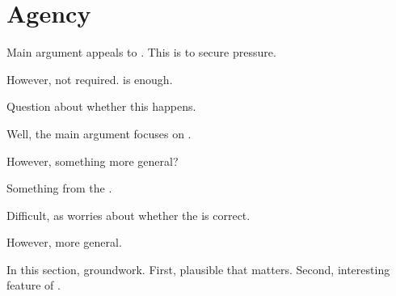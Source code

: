 \chapter{Agency}
\label{cha:embed}

\begin{note}
  Main argument appeals to \tCV{}.
  This is to secure pressure.

  However, not required.
  \requ{} is enough.

  Question about whether this happens.
\end{note}

\begin{note}
  Well, the main argument focuses on \tCV{}.

  However, something more general?

  Something from the \agpe{}.

  Difficult, as worries about whether the \agpe{} is correct.

  However, more general.

  In this section, groundwork.
  First, plausible that \agpe{} matters.
  Second, interesting feature of \requ{}.
\end{note}

\section{}
\label{sec:infl}

